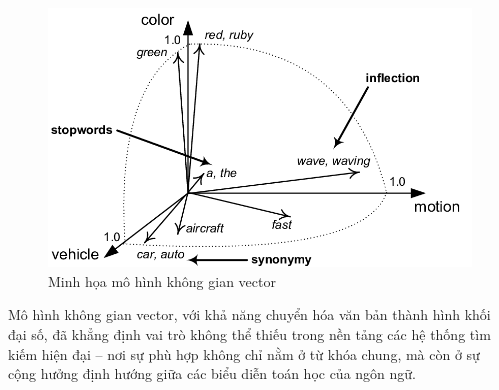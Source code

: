 \begin{figure}[H]
    \centering
    \caption{Minh họa mô hình không gian vector}
    \includegraphics[width=\linewidth]{assets/vsm-illustration.png}
\end{figure}

Mô hình không gian vector, với khả năng chuyển hóa văn bản thành hình khối đại số, đã khẳng định vai trò không thể thiếu trong nền tảng các hệ thống tìm kiếm hiện đại -- nơi sự phù hợp không chỉ nằm ở từ khóa chung, mà còn ở sự cộng hưởng định hướng giữa các biểu diễn toán học của ngôn ngữ.
